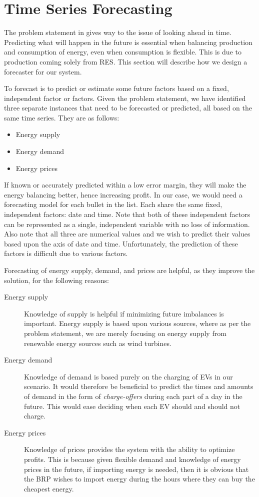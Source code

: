 \section{Time Series Forecasting}\label{sec:timeseriesforecasting}
The problem statement in  gives way to the issue of looking ahead in time. Predicting what will happen in the future is essential when balancing production and consumption of energy, even when consumption is flexible. This is due to production coming solely from RES. This section will describe how we design a forecaster for our system.

To forecast is to predict or estimate some future factors based on a fixed, independent factor or factors. Given the problem statement, we have identified three separate instances that need to be forecasted or predicted, all based on the same time series. They are as follows:

\begin{itemize}
  \item Energy supply
  \item Energy demand 
  \item Energy prices 
\end{itemize}

If known or accurately predicted within a low error margin, they will make the energy balancing better, hence increasing profit. In our case, we would need a forecasting model for each bullet in the list. Each share the same fixed, independent factors: date and time. Note that both of these independent factors can be represented as a single, independent variable with no loss of information. Also note that all three are numerical values and we wish to predict their values based upon the axis of date and time. Unfortunately, the prediction of these factors is difficult due to various factors. 

Forecasting of energy supply, demand, and prices are helpful, as they improve the solution, for the following reasons:

\begin{description}
  \item[Energy supply] Knowledge of supply is helpful if minimizing future imbalances is important. Energy supply is based upon various sources, where as per the problem statement, we are merely focusing on energy supply from renewable energy sources such as wind turbines.
  \item[Energy demand] Knowledge of demand is based purely on the charging of EVs in our scenario. It would therefore be beneficial to predict the times and amounts of demand in the form of \emph{charge-offers} during each part of a day in the future. This would ease deciding when each EV should and should not charge.
  \item[Energy prices] Knowledge of prices provides the system with the ability to optimize profits. This is because given flexible demand and knowledge of energy prices in the future, if importing energy is needed, then it is obvious that the BRP wishes to import energy during the hours where they can buy the cheapest energy.
\end{description}


